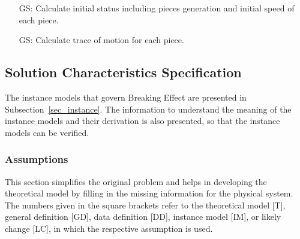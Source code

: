 \documentclass[12pt]{article}
\newcounter{goalnum} %
\newcommand{\progname}{Breaking Effect} %
\begin{document}
\begin{itemize}

\item[GS\refstepcounter{goalnum}\thegoalnum \label{G_speed}:] Calculate initial status including pieces generation and initial speed of each piece.​

\item[GS\refstepcounter{goalnum}\thegoalnum \label{G_motion}:] Calculate trace of motion for each piece.

\end{itemize}

\subsection{Solution Characteristics Specification}

The instance models that govern \progname{} are presented in
Subsection~\ref{sec_instance}.  The information to understand the meaning of the
instance models and their derivation is also presented, so that the instance
models can be verified.

\subsubsection{Assumptions}

This section simplifies the original problem and helps in developing the
theoretical model by filling in the missing information for the physical
system. The numbers given in the square brackets refer to the theoretical model
[T], general definition [GD], data definition [DD], instance model [IM], or
likely change [LC], in which the respective assumption is used.
\end{document}
